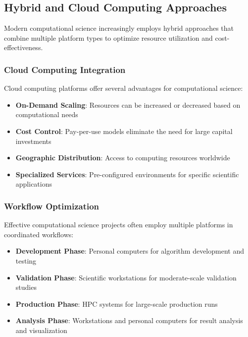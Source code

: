 \subsection{Hybrid and Cloud Computing Approaches}

Modern computational science increasingly employs hybrid approaches that combine multiple platform types to optimize resource utilization and cost-effectiveness.

\subsubsection{Cloud Computing Integration}

Cloud computing platforms offer several advantages for computational science:

\begin{itemize}
    \item \textbf{On-Demand Scaling}: Resources can be increased or decreased based on computational needs
    \item \textbf{Cost Control}: Pay-per-use models eliminate the need for large capital investments
    \item \textbf{Geographic Distribution}: Access to computing resources worldwide
    \item \textbf{Specialized Services}: Pre-configured environments for specific scientific applications
\end{itemize}

\subsubsection{Workflow Optimization}

Effective computational science projects often employ multiple platforms in coordinated workflows:

\begin{itemize}
    \item \textbf{Development Phase}: Personal computers for algorithm development and testing
    \item \textbf{Validation Phase}: Scientific workstations for moderate-scale validation studies
    \item \textbf{Production Phase}: HPC systems for large-scale production runs
    \item \textbf{Analysis Phase}: Workstations and personal computers for result analysis and visualization
\end{itemize}

